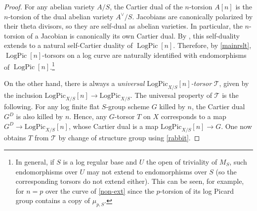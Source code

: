\documentclass[a4paper,11pt]{amsart} %
\numberwithin{equation}{subsection}
\newcommand{\on}[1]{\operatorname{#1}}
\newcommand{\ca}[1]{{\mathcal{#1}}}
\theoremstyle{definition}
\theoremstyle{plain}%
\theoremstyle{remark}
\begin{document}
\begin{proof}
    
For any abelian variety $A/S$, the Cartier dual of the $n$-torsion $A[n]$ is the $n$-torsion of the dual abelian variety $A^\vee/S$. Jacobians are canonically polarized by their theta divisors, so they are self-dual as abelian varieties. In particular, the $n$-torsion of a Jacobian is canonically its own Cartier dual. By \cite{MolchoUlirschWiseLogDelignePairing}, this self-duality extends to a natural self-Cartier duality of $\on{LogPic}[n]$. Therefore, by \ref{mainrslt}, $\on{LogPic}[n]$-torsors on a log curve are naturally identified with endomorphisms of $\on{LogPic}[n]$.\footnote{In general, if $S$ is a log regular base and $U$ the open of triviality of $M_S$, such endomorphisms over $U$ may not extend to endomorphisms over $S$ (so the corresponding torsors do not extend either). This can be seen, for example, for $n=p$ over the curve of \ref{non-ext} since the $p$-torsion of its log Picard group contains a copy of $\mu_{p,S}$.}

On the other hand, there is always a \emph{universal $\mathrm{LogPic}_{X/S}[n]$-torsor} $\ca T$, given by the inclusion $\mathrm{LogPic}_{X/S}[n] \to \mathrm{LogPic}_{X/S}$. The universal property of $\ca T$ is the following. For any log finite flat $S$-group scheme $G$ killed by $n$, the Cartier dual $G^D$ is also killed by $n$. Hence, any $G$-torsor $T$ on $X$ corresponds to a map $G^D \to \mathrm{LogPic}_{X/S}[n]$, whose Cartier dual is a map $\mathrm{LogPic}_{X/S}[n] \to G$.
One now obtains $T$ from $\ca T$ by change of structure group using \ref{rabbit}.
\end{proof}
\end{document}
